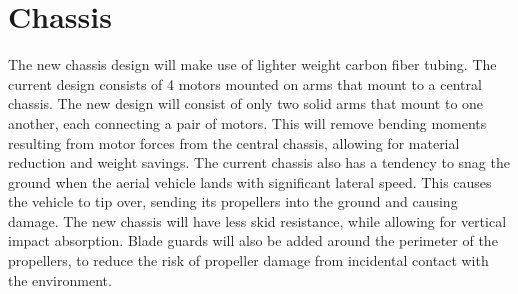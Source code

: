 \documentclass[12pt,letterpaper]{article}
\begin{document}
\section*{Chassis}
The new chassis design will make use of lighter weight carbon fiber tubing.  The
 current design consists of 4 motors mounted on arms that mount to a central 
chassis.  The new design will consist of only two solid arms that mount to one 
another, each connecting a pair of motors.  This will remove bending moments 
resulting from motor forces from the central chassis, allowing for material 
reduction and weight savings.  The current chassis also has a tendency to snag 
the ground when the aerial vehicle lands with significant lateral speed.  This 
causes the vehicle to tip over, sending its propellers into the ground and 
causing damage.  The new chassis will have less skid resistance, while allowing 
for vertical impact absorption.  Blade guards will also be added around the 
perimeter of the propellers, to reduce the risk of propeller damage from 
incidental contact with the environment.
\end{document}
